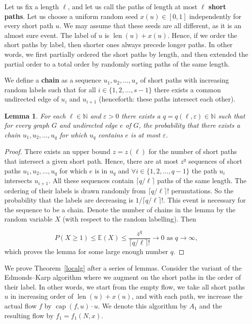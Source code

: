 \documentclass[12pt,a4paper]{article}
\newtheorem{Lemma}[Theorem]{Lemma}
\newcommand{\len}{\operatorname{len}}
\newcommand{\capp}{\operatorname{cap}}
\newcommand{\eps}{\varepsilon}
\newcommand{\E}{\mathbb{E}}
\renewcommand{\:}{\colon}
\begin{document}
Let us fix a length $\ell$, and let us call the paths of length at most $\ell$ \textbf{short paths}.
Let us choose a uniform random seed $x(u)\in [0,1]$ independently for every short path $u$. 
We may assume that these seeds are all different, as it is an almost sure event. 
The label of $u$ is $\len(u)+x(u)$. 
Hence, if we order the short paths by label, then shorter ones always precede longer paths. 
In other words, we first partially ordered the short paths by length, and then extended the partial order to a total order by randomly sorting paths of the same length. 

We define a \textbf{chain} as a sequence $u_1, u_2, \ldots,  u_s$ of short paths with increasing random labels such that for all $i \in \{1, 2, \ldots, s-1\}$ there exists a common undirected edge of $u_i$ and $u_{i+1}$ (henceforth: these paths intersect each other). 

\begin{Lemma} \label{spread}
For each $\ell \in \mathbb{N}$ and $\eps > 0$ there exists a $q = q(\ell, \eps) \in \mathbb{N}$ such that for every graph $G$ and undirected edge $e$ of $G$, the probability that there exists a chain $u_1, u_2, \ldots, u_q$ for which $u_q$ contains $e$ is at most $\eps$.
\end{Lemma}

\begin{proof}
There exists an upper bound $z = z(\ell)$ for the number of short paths that intersect a given short path. 
Hence, there are at most $z^q$ sequences of short paths $u_1, u_2, \ldots, u_q$ for which $e$ is in $u_q$ and $\forall i \in \{1, 2, \ldots, q-1\}$ the path $u_i$ intersects $u_{i+1}$. 
All these sequences contain $\lceil q/\ell \rceil$ paths of the same length. 
The ordering of their labels is drawn randomly from $\lceil q/\ell \rceil !$ permutations. 
So the probability that the labels are decreasing is $1 / \lceil q/\ell \rceil !$. This event is necessary for the sequence to be a chain. Denote the number of chains in the lemma by the random variable $X$ (with respect to the random labelling). Then 

\begin{equation*}
P(X \ge 1) \le \E(X) \le \frac{z^q}{\lceil q/\ell \rceil !} \rightarrow 0 \text{ as } q \rightarrow \infty ,
\end{equation*}
which proves the lemma for some large enough number $q$.
\end{proof}

We prove Theorem~\ref{localg} after a series of lemmas. 
Consider the variant of the Edmonds--Karp algorithm where we augment on the short paths in the order of their label. In other words, we start from the empty flow, we take all short paths $u$ in increasing order of $\len(u) + x(u)$, and with each path, we increase the actual flow $f$ by $\capp(f, u) \cdot u$. 
We denote this algorithm by $A_1$ and the resulting flow by $f_1 = f_1(N, x)$.
\end{document}
